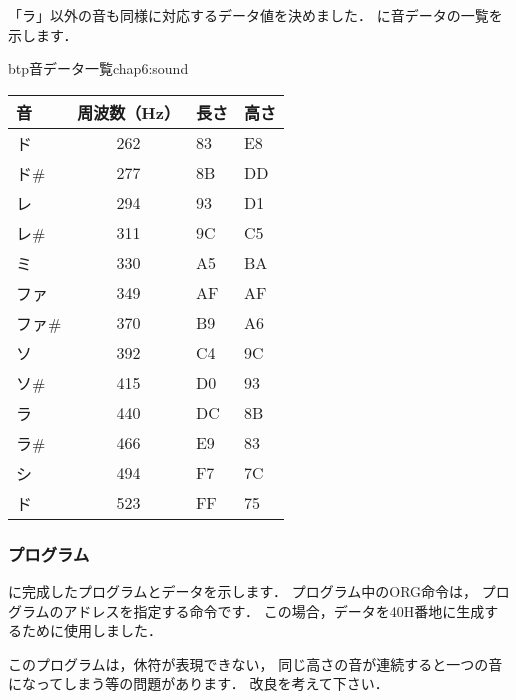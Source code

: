 「ラ」以外の音も同様に対応するデータ値を決めました．
に音データの一覧を示します．

\begin{mytable}{btp}{音データ一覧}{chap6:sound}
{\small\begin{tabular}{ l | c | l | l }
\hline\hline
音      & 周波数（Hz） & 長さ & 高さ \\
\hline
ド      & 262 & 83 & E8 \\
ド\#    & 277 & 8B & DD \\
レ      & 294 & 93 & D1 \\
レ\#    & 311 & 9C & C5 \\
ミ      & 330 & A5 & BA \\
ファ    & 349 & AF & AF \\
ファ\#  & 370 & B9 & A6 \\
ソ      & 392 & C4 & 9C \\
ソ\#    & 415 & D0 & 93 \\
ラ      & 440 & DC & 8B \\
ラ\#    & 466 & E9 & 83 \\
シ      & 494 & F7 & 7C \\
ド      & 523 & FF & 75 \\
\end{tabular}}
\end{mytable}

\subsubsection{プログラム}

に完成したプログラムとデータを示します．
プログラム中のORG命令は，
プログラムのアドレスを指定する命令です．
この場合，データを40H番地に生成するために使用しました．

このプログラムは，休符が表現できない，
同じ高さの音が連続すると一つの音になってしまう等の問題があります．
改良を考えて下さい．

